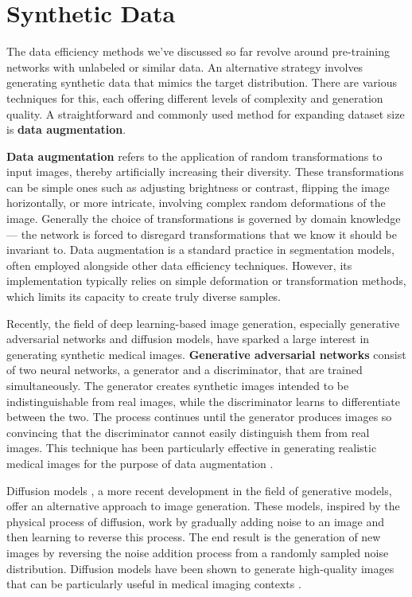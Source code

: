 \section{Synthetic Data}

The data efficiency methods we've discussed so far revolve around pre-training networks with unlabeled or similar data. An alternative strategy involves generating synthetic data that mimics the target distribution. There are various techniques for this, each offering different levels of complexity and generation quality. A straightforward and commonly used method for expanding dataset size is \textbf{data augmentation}.

\textbf{Data augmentation} refers to the application of random transformations to input images, thereby artificially increasing their diversity. These transformations can be simple ones such as adjusting brightness or contrast, flipping the image horizontally, or more intricate, involving complex random deformations of the image. Generally the choice of transformations is governed by domain knowledge --- the network is forced to disregard transformations that we know it should be invariant to. Data augmentation is a standard practice in segmentation models, often employed alongside other data efficiency techniques. However, its implementation typically relies on simple deformation or transformation methods, which limits its capacity to create truly diverse samples.

Recently, the field of deep learning-based image generation, especially generative adversarial networks and diffusion models, have sparked a large interest in generating synthetic medical images. \textbf{Generative adversarial networks} \cite{goodfellowGenerativeAdversarialNetworks2014} consist of two neural networks, a generator and a discriminator, that are trained simultaneously. The generator creates synthetic images intended to be indistinguishable from real images, while the discriminator learns to differentiate between the two. The process continues until the generator produces images so convincing that the discriminator cannot easily distinguish them from real images. This technique has been particularly effective in generating realistic medical images for the purpose of data augmentation \cite{shinMedicalImageSynthesis2018}.

Diffusion models \cite{ho2020denoising}, a more recent development in the field of generative models, offer an alternative approach to image generation. These models, inspired by the physical process of diffusion, work by gradually adding noise to an image and then learning to reverse this process. The end result is the generation of new images by reversing the noise addition process from a randomly sampled noise distribution. Diffusion models have been shown to generate high-quality images that can be particularly useful in medical imaging contexts \cite{khaderDenoisingDiffusionProbabilistic2023}.


